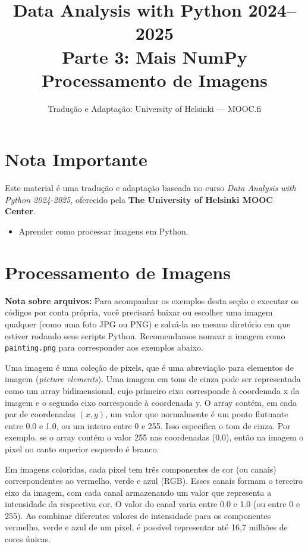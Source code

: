 \documentclass[11pt,a4paper]{article}
\title{\textbf{Data Analysis with Python 2024--2025}\\Parte 3: Mais NumPy\\\large Processamento de Imagens}
\author{Tradução e Adaptação: University of Helsinki --- MOOC.fi}
\date{}
\begin{document}
\maketitle

\section*{Nota Importante}
Este material é uma tradução e adaptação baseada no curso \textit{Data Analysis with Python 2024-2025}, oferecido pela \textbf{The University of Helsinki MOOC Center}.

\begin{objetivos}
\begin{itemize}
    \item Aprender como processar imagens em Python.
\end{itemize}
\end{objetivos}

\tableofcontents
\newpage

\section{Processamento de Imagens}

\textbf{Nota sobre arquivos:} Para acompanhar os exemplos desta seção e executar os códigos por conta própria, você precisará baixar ou escolher uma imagem qualquer (como uma foto JPG ou PNG) e salvá-la no mesmo diretório em que estiver rodando seus scripts Python. Recomendamos nomear a imagem como \texttt{painting.png} para corresponder aos exemplos abaixo.

Uma imagem é uma coleção de pixels, que é uma abreviação para elementos de imagem (\textit{picture elements}). Uma imagem em tons de cinza pode ser representada como um array bidimensional, cujo primeiro eixo corresponde à coordenada x da imagem e o segundo eixo corresponde à coordenada y. O array contém, em cada par de coordenadas $(x,y)$, um valor que normalmente é um ponto flutuante entre 0.0 e 1.0, ou um inteiro entre 0 e 255. Isso especifica o tom de cinza. Por exemplo, se o array contém o valor 255 nas coordenadas (0,0), então na imagem o pixel no canto superior esquerdo é branco.

Em imagens coloridas, cada pixel tem três componentes de cor (ou canais) correspondentes ao vermelho, verde e azul (RGB). Esses canais formam o terceiro eixo da imagem, com cada canal armazenando um valor que representa a intensidade da respectiva cor. O valor do canal varia entre 0.0 e 1.0 (ou entre 0 e 255). Ao combinar diferentes valores de intensidade para os componentes vermelho, verde e azul de um pixel, é possível representar até 16,7 milhões de cores únicas.
\end{document}
